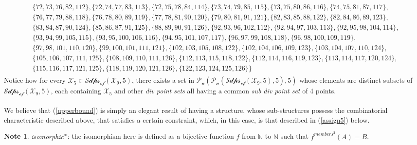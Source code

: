 \documentclass[11pt, oneside]{article}      %
\theoremstyle{definition}
\newtheorem*{note}{Note}
\numberwithin{equation}{section}
\newcommand{\reff}[1]{(\ref{#1})}
\theoremstyle{c}
\begin{document}
{\begin{align*}
\begin{split}
&\{72,73,76,82,112\},\{72,74,77,83,113\},\{72,75,78,84,114\},\{73,74,79,85,115\},\{73,75,80,86,116\},\{74,75,81,87,117\},\\
&\{76,77,79,88,118\},\{76,78,80,89,119\},\{77,78,81,90,120\},\{79,80,81,91,121\},\{82,83,85,88,122\},\{82,84,86,89,123\},\\
&\{83,84,87,90,124\},\{85,86,87,91,125\},\{88,89,90,91,126\},\{92,93,96,102,112\},\{92,94,97,103,113\},\{92,95,98,104,114\},\\
&\{93,94,99,105,115\},\{93,95,100,106,116\},\{94,95,101,107,117\},\{96,97,99,108,118\},\{96,98,100,109,119\}, \\
&\{97,98,101,110,120\},
\{99,100,101,111,121\},\{102,103,105,108,122\},\{102,104,106,109,123\},\{103,104,107,110,124\},\\
&\{105,106,107,111,125\}, \{108,109,110,111,126\}, \{112,113,115,118,122\},\{112,114,116,119,123\},\{113,114,117,120,124\},\\
&\{115,116,117,121,125\}, \{118,119,120,121,126\},\{122,123,124,125,126\}\}\end{split}
\end{align*}
}Notice how for every $\mathscr{X_5} \in  \mathscr{Sdps_{of}}(\mathscr{X_9},5)$, there exists a set in $\mathcal{P_n}(\mathcal{P_n}(\mathscr{Sdps_{of}}(\mathscr{X_9},5),5),5)$ whose elements are distinct subsets of $\mathscr{Sdps_{of}}(\mathscr{X_9},5)$, each containing $\mathscr{X_5}$ and other \textit{div point sets} all having a common \textit{sub div point set} of 4 points.
\\ \\
We believe that \reff{upperbound} is simply an elegant result of having a structure, whose sub-structures possess the combinatorial characteristic described above, that satisfies a certain constraint, which, in this case, is that described in \reff{assign5} below.

\begin{note}
\textit{isomorphic$\color{black}^*$}: the isomorphism here is defined as a bijective function $f$ from $\mathbb{N}$ to $\mathbb{N}$ such that $f^{members^{2}}(A) = B$.
\end{note}
\end{document}
